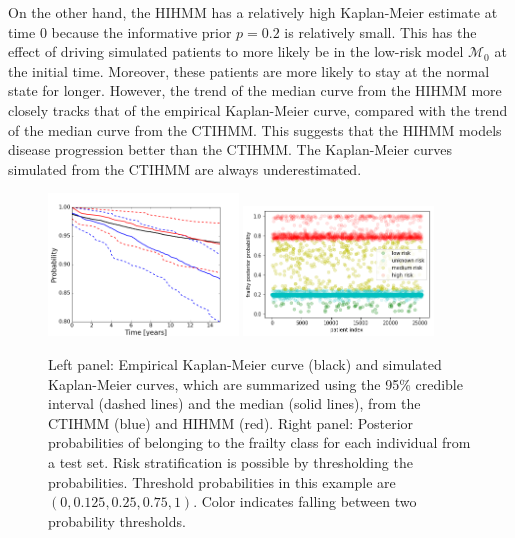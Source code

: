 \documentclass{article}
\begin{document}
On the other hand, the HIHMM has a relatively high Kaplan-Meier estimate at time $0$ because the informative prior $p = 0.2$ is relatively small. This has the effect of driving simulated patients to more likely be in the low-risk model $\mathcal{M_0}$ at the initial time. Moreover, these patients are more likely to stay at the normal state for longer. However, the trend of the median curve from the HIHMM more closely tracks that of the empirical Kaplan-Meier curve, compared with the trend of the median curve from the CTIHMM. This suggests that the HIHMM models disease progression better than the CTIHMM. The Kaplan-Meier curves simulated from the CTIHMM are always underestimated.
\begin{figure}
	\centering
    \includegraphics[width = 0.45\textwidth]{pic/hmm/KM_curve_shared_version1}
    \includegraphics[width = 0.45\textwidth]{pic/hierarchical-hmm-posterior-frailty-probs.png}
	\caption{Left panel: Empirical Kaplan-Meier curve (black) and simulated Kaplan-Meier curves, which are summarized using the 95\% credible interval (dashed lines) and the median (solid lines), from the CTIHMM (blue) and HIHMM (red). Right panel: Posterior probabilities of belonging to the frailty class for each individual from a test set. Risk stratification is possible by thresholding the probabilities. Threshold probabilities in this example are $(0, 0.125,0.25, 0.75,1)$. Color indicates falling between two probability thresholds.}
	\label{KM_PF}
\end{figure}
\end{document}
